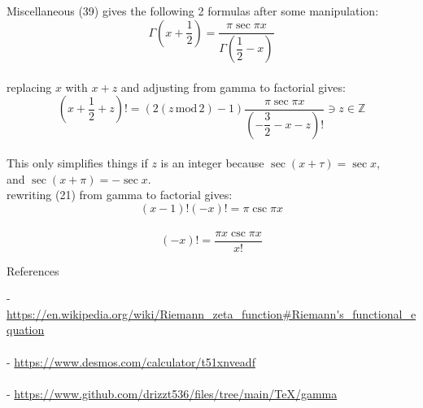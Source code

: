 \documentclass[12pt]{article}
\begin{document}
\pagebreak\begin{section}{Miscellaneous}
	(39) gives the following 2 formulas after some manipulation:
	\begin{equation}
		\Gamma\left(x+\dfrac12\right)=\dfrac{\pi\sec\pi x}{\Gamma\left(\dfrac12-x\right)}
	\end{equation}\\
	replacing $x$ with $x+z$ and adjusting from gamma to factorial gives:\\
	\begin{equation}
		\left(x+\frac12+z\right)!=\left(2\left(z\,\text{mod}\,2\right)-1\right)\dfrac{\pi\sec\pi x}{\left(-\dfrac32-x-z\right)!}\ni z\in\mathbb Z
	\end{equation}\\
	This only simplifies things if $z$ is an integer because $\sec(x+\tau)=\sec x$,\\
	and $\sec(x+\pi)=-\sec x$.\\
	rewriting (21) from gamma to factorial gives:
	\begin{equation}
		(x-1)!(-x)!=\pi\csc\pi x
	\end{equation}\\
	\begin{equation}
		(-x)!=\dfrac{\pi x\csc\pi x}{x!}
	\end{equation}
\end{section}

\pagebreak\begin{section}{References}

	\noindent- \url{https://en.wikipedia.org/wiki/Riemann\_zeta\_function\#Riemann's\_functional\_equation}\\
	\indent{}\\

	\noindent- \url{https://www.desmos.com/calculator/t51xnveadf}\\
	\indent{}\\

	\noindent- \url{https://www.github.com/drizzt536/files/tree/main/TeX/gamma}\\
	\indent{}
\end{section}
\end{document}
